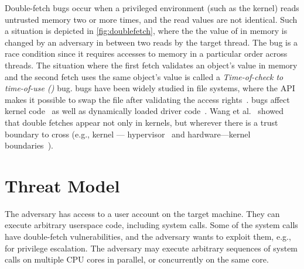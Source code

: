 \documentclass[letterpaper,twocolumn,10pt]{article}
\begin{document}
Double-fetch bugs occur when a privileged environment (such as the kernel)
reads untrusted memory two or more times, and the read values are not 
identical. 
Such a situation is depicted in \autoref{fig:doublefetch}, 
where the the value of  in memory is changed by an adversary
in between two reads by the target thread.
The bug is a race condition since it requires accesses to memory in 
a particular order across threads.
The situation where the first fetch validates an object's value in memory and 
the second fetch uses the same object's value is called a 
\emph{Time-of-check to time-of-use (\tocttou)} bug.
\tocttou bugs have been widely studied in file systems, where the 
API makes it possible to swap the file after validating the access 
rights~\cite{payer2012protecting,
pu2006methodical, wei2010modeling, tsafrir2008portably,Garfinkel03}.
\tocttou bugs affect kernel code~\cite{jurczyk2013bochspwn, wang2018survey}
as well as dynamically loaded driver code~\cite{cve201812633,cve201812633fix}.
Wang et al.~\cite{wang2018survey} showed that double fetches appear not only
in kernels, but wherever there is a trust boundary to cross (e.g., kernel ---
hypervisor~\cite{wilhelm2016xenpwn} and hardware---kernel
boundaries~\cite{lu2018untrusted}). 




\section{Threat Model}
\label{sec:threatmodel}

The adversary has access to a user account on the target machine. They can
execute arbitrary userspace code, including system calls. Some of the system 
calls have double-fetch vulnerabilities, and the adversary wants to exploit them,
e.g., for privilege escalation.
The adversary may execute arbitrary sequences of system calls on multiple CPU
cores in parallel, or concurrently on the same core.
\end{document}
